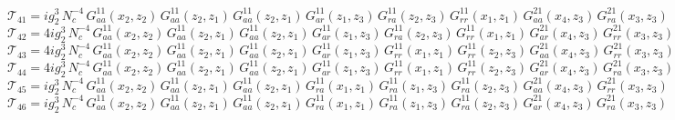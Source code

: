 \documentclass{article}
\begin{document}
\begin{equation*}
\mathcal{T}_{41} = i g_{2}^{3}\,N_c^{-4}\,G^{11}_{aa}\left(x_2,z_{2}\right) \, G^{11}_{aa}\left(z_{2},z_{1}\right) \, G^{11}_{aa}\left(z_{2},z_{1}\right) \, G^{11}_{ar}\left(z_{1},z_{3}\right) \, G^{11}_{ra}\left(z_{2},z_{3}\right) \, G^{11}_{rr}\left(x_1,z_{1}\right) \, G^{21}_{aa}\left(x_4,z_{3}\right) \, G^{21}_{ra}\left(x_3,z_{3}\right)
\end{equation*}
\begin{equation*}
\mathcal{T}_{42} = 4 i g_{2}^{3}\,N_c^{-4}\,G^{11}_{aa}\left(x_2,z_{2}\right) \, G^{11}_{aa}\left(z_{2},z_{1}\right) \, G^{11}_{aa}\left(z_{2},z_{1}\right) \, G^{11}_{ar}\left(z_{1},z_{3}\right) \, G^{11}_{ra}\left(z_{2},z_{3}\right) \, G^{11}_{rr}\left(x_1,z_{1}\right) \, G^{21}_{ar}\left(x_4,z_{3}\right) \, G^{21}_{rr}\left(x_3,z_{3}\right)
\end{equation*}
\begin{equation*}
\mathcal{T}_{43} = 4 i g_{2}^{3}\,N_c^{-4}\,G^{11}_{aa}\left(x_2,z_{2}\right) \, G^{11}_{aa}\left(z_{2},z_{1}\right) \, G^{11}_{aa}\left(z_{2},z_{1}\right) \, G^{11}_{ar}\left(z_{1},z_{3}\right) \, G^{11}_{rr}\left(x_1,z_{1}\right) \, G^{11}_{rr}\left(z_{2},z_{3}\right) \, G^{21}_{aa}\left(x_4,z_{3}\right) \, G^{21}_{rr}\left(x_3,z_{3}\right)
\end{equation*}
\begin{equation*}
\mathcal{T}_{44} = 4 i g_{2}^{3}\,N_c^{-4}\,G^{11}_{aa}\left(x_2,z_{2}\right) \, G^{11}_{aa}\left(z_{2},z_{1}\right) \, G^{11}_{aa}\left(z_{2},z_{1}\right) \, G^{11}_{ar}\left(z_{1},z_{3}\right) \, G^{11}_{rr}\left(x_1,z_{1}\right) \, G^{11}_{rr}\left(z_{2},z_{3}\right) \, G^{21}_{ar}\left(x_4,z_{3}\right) \, G^{21}_{ra}\left(x_3,z_{3}\right)
\end{equation*}
\begin{equation*}
\mathcal{T}_{45} = i g_{2}^{3}\,N_c^{-4}\,G^{11}_{aa}\left(x_2,z_{2}\right) \, G^{11}_{aa}\left(z_{2},z_{1}\right) \, G^{11}_{aa}\left(z_{2},z_{1}\right) \, G^{11}_{ra}\left(x_1,z_{1}\right) \, G^{11}_{ra}\left(z_{1},z_{3}\right) \, G^{11}_{ra}\left(z_{2},z_{3}\right) \, G^{21}_{aa}\left(x_4,z_{3}\right) \, G^{21}_{rr}\left(x_3,z_{3}\right)
\end{equation*}
\begin{equation*}
\mathcal{T}_{46} = i g_{2}^{3}\,N_c^{-4}\,G^{11}_{aa}\left(x_2,z_{2}\right) \, G^{11}_{aa}\left(z_{2},z_{1}\right) \, G^{11}_{aa}\left(z_{2},z_{1}\right) \, G^{11}_{ra}\left(x_1,z_{1}\right) \, G^{11}_{ra}\left(z_{1},z_{3}\right) \, G^{11}_{ra}\left(z_{2},z_{3}\right) \, G^{21}_{ar}\left(x_4,z_{3}\right) \, G^{21}_{ra}\left(x_3,z_{3}\right)
\end{equation*}
\end{document}
